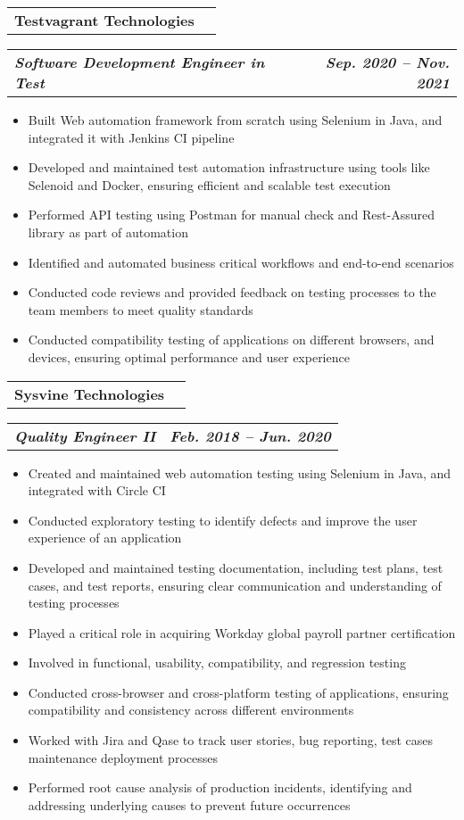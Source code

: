 \documentclass[letterpaper,11pt]{article}
\makeatletter
\newcommand{\resumeItem}[1]{
  \item\small{
    {#1 \vspace{-1pt}}
  }
}
\newcommand{\resumeSubheading}[4]{
  \vspace{-1pt}\item
    \begin{tabular*}{\textwidth}[t]{l@{\extracolsep{\fill}}r}
      \textbf{#1} & {\color{dark-grey}\small #2}\vspace{1pt}\\ %
    \end{tabular*}\vspace{-4pt}
}
\newcommand{\resumeSubSubheading}[2]{
    \item
    \begin{tabular*}{\textwidth}{l@{\extracolsep{\fill}}r}
      \textbf{\textit{\small #1}} & \textbf{\textit{\small #2}} \\
    \end{tabular*}\vspace{-7pt}
}
\newcommand{\resumeItemListStart}{\begin{itemize}}
\newcommand{\resumeItemListEnd}{\end{itemize}\vspace{0pt}}
\makeatother
\begin{document}
    \resumeSubheading
      {Testvagrant Technologies}{}
      {}{}
      \resumeSubSubheading
      {Software Development Engineer in Test}{Sep. 2020 -- Nov. 2021}
      \resumeItemListStart
        \resumeItem{Built Web automation framework from scratch using Selenium in Java, and integrated it with Jenkins CI pipeline}
        \resumeItem{Developed and maintained test automation infrastructure using tools like Selenoid and Docker, ensuring efficient and scalable test execution}
        \resumeItem{Performed API testing using Postman for manual check and Rest-Assured library as part of automation}
        \resumeItem{Identified and automated business critical workflows and end-to-end scenarios}
        \resumeItem{Conducted code reviews and provided feedback on testing processes to the team members to meet quality standards}
        \resumeItem{Conducted compatibility testing of applications on different browsers, and devices, ensuring optimal performance and user experience}
    \resumeItemListEnd

    \resumeSubheading
      {Sysvine Technologies}{}
      {}{}
      \resumeSubSubheading
      {Quality Engineer II}{Feb. 2018 -- Jun. 2020}
      \resumeItemListStart
        \resumeItem{Created and maintained web automation testing using Selenium in Java, and integrated with Circle CI}
        \resumeItem{Conducted exploratory testing to identify defects and improve the user experience of an application}
        \resumeItem{Developed and maintained testing documentation, including test plans, test cases, and test reports, ensuring clear communication and understanding of testing processes}
        \resumeItem{Played a critical role in acquiring Workday global payroll partner certification}
        \resumeItem{Involved in functional, usability, compatibility, and regression testing}
        \resumeItem{Conducted cross-browser and cross-platform testing of applications, ensuring compatibility and consistency across different environments}
        \resumeItem{Worked with Jira and Qase to track user stories, bug reporting, test cases maintenance deployment processes}
        \resumeItem{Performed root cause analysis of production incidents, identifying and addressing underlying causes to prevent future occurrences}
      \resumeItemListEnd
\end{document}
